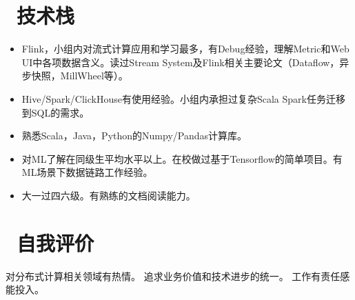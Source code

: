 \documentclass{resume}
\begin{document}
\section{\faCogs\ 技术栈}
\begin{itemize}[parsep=0.5ex]
  \item Flink，小组内对流式计算应用和学习最多，有Debug经验，理解Metric和Web UI中各项数据含义。读过Stream System及Flink相关主要论文（Dataflow，异步快照，MillWheel等）。
  \item Hive/Spark/ClickHouse有使用经验。小组内承担过复杂Scala Spark任务迁移到SQL的需求。
  \item 熟悉Scala，Java，Python的Numpy/Pandas计算库。
  \item 对ML了解在同级生平均水平以上。在校做过基于Tensorflow的简单项目。有ML场景下数据链路工作经验。
  \item 大一过四六级。有熟练的文档阅读能力。

  
\end{itemize}

\section{\faInfo\ 自我评价}
\begin{onehalfspacing}
对分布式计算相关领域有热情。
追求业务价值和技术进步的统一。
工作有责任感能投入。
\end{onehalfspacing}

%
%
\end{document}
